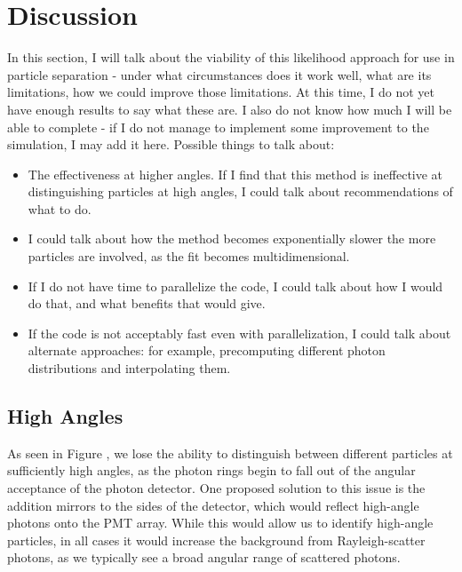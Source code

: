 
\chapter{Discussion}
\label{ch:Discussion}




In this section, I will talk about the viability of this likelihood approach for use in particle separation - under what circumstances does it work well, what are its limitations, how we could improve those limitations. At this time, I do not yet have enough results to say what these are. I also do not know how much I will be able to complete - if I do not manage to implement some improvement to the simulation, I may add it here. Possible things to talk about:
\begin{itemize}
\item The effectiveness at higher angles. If I find that this method is ineffective at distinguishing particles at high angles, I could talk about recommendations of what to do.
\item I could talk about how the method becomes exponentially slower the more particles are involved, as the fit becomes multidimensional.
\item If I do not have time to parallelize the code, I could talk about how I would do that, and what benefits that would give.
\item If the code is not acceptably fast even with parallelization, I could talk about alternate approaches: for example, precomputing different photon distributions and interpolating them.
\end{itemize}

\section{High Angles}
As seen in Figure , we lose the ability to distinguish between different particles at sufficiently high angles, as the photon rings begin to fall out of the angular acceptance of the photon detector.
One proposed solution to this issue is the addition mirrors to the sides of the detector, which would reflect high-angle photons onto the PMT array. 
While this would allow us to identify high-angle particles, in all cases it would increase the background from Rayleigh-scatter photons, as we typically see a broad angular range of scattered photons.

